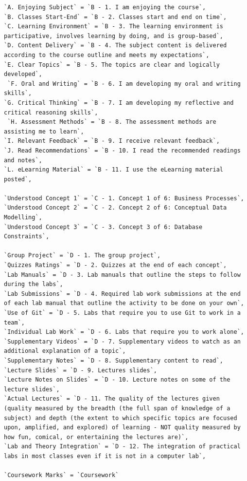 \documentclass[
]{article}
\begin{document}
\begin{verbatim}
`A. Enjoying Subject` = `B - 1. I am enjoying the course`,
`B. Classes Start-End` = `B - 2. Classes start and end on time`,
`C. Learning Environment` = `B - 3. The learning environment is participative, involves learning by doing, and is group-based`,
`D. Content Delivery` = `B - 4. The subject content is delivered according to the course outline and meets my expectations`,
`E. Clear Topics` = `B - 5. The topics are clear and logically developed`,
 `F. Oral and Writing` = `B - 6. I am developing my oral and writing skills`,
`G. Critical Thinking` = `B - 7. I am developing my reflective and critical reasoning skills`,
 `H. Assessment Methods` = `B - 8. The assessment methods are assisting me to learn`,
`I. Relevant Feedback` = `B - 9. I receive relevant feedback`,
`J. Read Recommendations` = `B - 10. I read the recommended readings and notes`,
`L. eLearning Material` = `B - 11. I use the eLearning material posted`,

`Understood Concept 1` = `C - 1. Concept 1 of 6: Business Processes`,
`Understood Concept 2` = `C - 2. Concept 2 of 6: Conceptual Data Modelling`,
`Understood Concept 3` = `C - 3. Concept 3 of 6: Database Constraints`,

`Group Project` = `D - 1. The group project`,
`Quizzes Ratings` = `D - 2. Quizzes at the end of each concept`,
`Lab Manuals` = `D - 3. Lab manuals that outline the steps to follow during the labs`,
`Lab Submissions` = `D - 4. Required lab work submissions at the end of each lab manual that outline the activity to be done on your own`,
`Use of Git` = `D - 5. Labs that require you to use Git to work in a team`,
`Individual Lab Work` = `D - 6. Labs that require you to work alone`,
`Supplementary Videos` = `D - 7. Supplementary videos to watch as an additional explanation of a topic`,
`Supplementary Notes` = `D - 8. Supplementary content to read`,
`Lecture Slides` = `D - 9. Lectures slides`,
`Lecture Notes on Slides` = `D - 10. Lecture notes on some of the lecture slides`,
`Actual Lectures` = `D - 11. The quality of the lectures given (quality measured by the breadth (the full span of knowledge of a subject) and depth (the extent to which specific topics are focused upon, amplified, and explored) of learning - NOT quality measured by how fun, comical, or entertaining the lectures are)`,
`Lab and Theory Integration` = `D - 12. The integration of practical labs in most classes even if it is not in a computer lab`,

`Coursework Marks` = `Coursework`
\end{verbatim}
\end{document}
